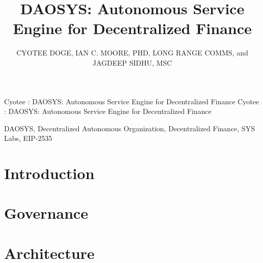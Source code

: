 \documentclass[peerreview]{ieeesyscoin}
\begin{document}
\history{}

\title{\centering DAOSYS: Autonomous Service Engine for Decentralized Finance}
\author{\centering  \uppercase{Cyotee Doge}, 
\uppercase{Ian C. Moore, PhD},
\uppercase{Long Range Comms}, and
\uppercase{Jagdeep Sidhu, MSc}}

\address[1]{\centering DAO Advisor, Syscoin Platform (e-mail: cyotee@syscoin.org)}
\address[2]{\centering  Syscoin Researcher, Syscoin Platform (e-mail: imoore@syscoin.org)}
\address[3]{\centering  L2 Advisor, Syscoin Platform (e-mail: lrc@syscoin.org)}
\address[4]{\centering Syscoin Foundation President and
Lead Developer, (e-mail: sidhujag@syscoin.org)}
\tfootnote{}

\markboth
{Cyotee \headeretal: DAOSYS: Autonomous Service Engine for Decentralized Finance}
{Cyotee \headeretal: DAOSYS: Autonomous Service Engine for Decentralized Finance}

\corresp{}

\begin{abstract}
\lipsum[1]
\end{abstract}

\begin{keywords}
DAOSYS, Decentralized Autonomous Organization, Decentralized Finance, SYS Labs, EIP-2535
\end{keywords}

\titlepgskip=-15pt

\maketitle

\section{Introduction}
\label{sec:introduction}

\lipsum[2-4]

\section{Governance}
\label{sec:governance}

\lipsum[2-4]

\section{Architecture}
\label{sec:architecture}

\lipsum[2-4]
\end{document}
